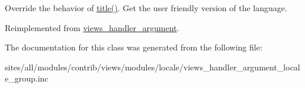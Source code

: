 Override the behavior of \hyperlink{classviews__handler__argument__locale__group_5eb8e22e84904fa604f785484befe86a}{title()}. Get the user friendly version of the language. 

Reimplemented from \hyperlink{classviews__handler__argument_76181ac24e7be4a09aaafc1fa5f15ea1}{views\_\-handler\_\-argument}.

The documentation for this class was generated from the following file:\begin{CompactItemize}
\item 
sites/all/modules/contrib/views/modules/locale/views\_\-handler\_\-argument\_\-locale\_\-group.inc\end{CompactItemize}
